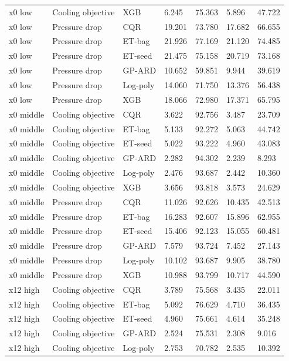 \begin{longtable}{lllllll}
x0 low & Cooling objective & XGB & 6.245 & 75.363 & 5.896 & 47.722\\
x0 low & Pressure drop & CQR & 19.201 & 73.780 & 17.682 & 66.655\\
x0 low & Pressure drop & ET-bag & 21.926 & 77.169 & 21.120 & 74.485\\
x0 low & Pressure drop & ET-seed & 21.475 & 75.158 & 20.719 & 73.168\\
x0 low & Pressure drop & GP-ARD & 10.652 & 59.851 & 9.944 & 39.619\\
x0 low & Pressure drop & Log-poly & 14.060 & 71.750 & 13.376 & 56.438\\
x0 low & Pressure drop & XGB & 18.066 & 72.980 & 17.371 & 65.795\\
x0 middle & Cooling objective & CQR & 3.622 & 92.756 & 3.487 & 23.709\\
x0 middle & Cooling objective & ET-bag & 5.133 & 92.272 & 5.063 & 44.742\\
x0 middle & Cooling objective & ET-seed & 5.022 & 93.222 & 4.960 & 43.083\\
x0 middle & Cooling objective & GP-ARD & 2.282 & 94.302 & 2.239 & 8.293\\
x0 middle & Cooling objective & Log-poly & 2.476 & 93.687 & 2.442 & 10.360\\
x0 middle & Cooling objective & XGB & 3.656 & 93.818 & 3.573 & 24.629\\
x0 middle & Pressure drop & CQR & 11.026 & 92.626 & 10.435 & 42.513\\
x0 middle & Pressure drop & ET-bag & 16.283 & 92.607 & 15.896 & 62.955\\
x0 middle & Pressure drop & ET-seed & 15.406 & 92.123 & 15.055 & 60.481\\
x0 middle & Pressure drop & GP-ARD & 7.579 & 93.724 & 7.452 & 27.143\\
x0 middle & Pressure drop & Log-poly & 10.102 & 93.687 & 9.905 & 38.780\\
x0 middle & Pressure drop & XGB & 10.988 & 93.799 & 10.717 & 44.590\\
x12 high & Cooling objective & CQR & 3.789 & 75.568 & 3.435 & 22.011\\
x12 high & Cooling objective & ET-bag & 5.092 & 76.629 & 4.710 & 36.435\\
x12 high & Cooling objective & ET-seed & 4.960 & 75.661 & 4.614 & 35.248\\
x12 high & Cooling objective & GP-ARD & 2.524 & 75.531 & 2.308 & 9.016\\
x12 high & Cooling objective & Log-poly & 2.753 & 70.782 & 2.535 & 10.392\\

\end{longtable}
